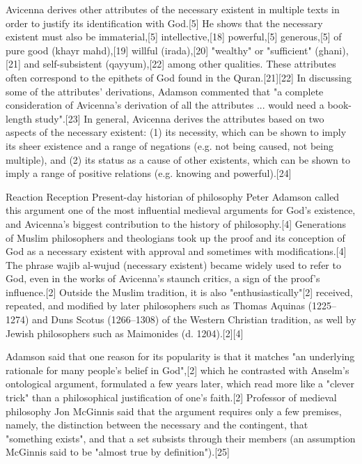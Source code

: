 Avicenna derives other attributes of the necessary existent in multiple texts in order to justify its identification with God.[5] He shows that the necessary existent must also be immaterial,[5] intellective,[18] powerful,[5] generous,[5] of pure good (khayr mahd),[19] willful (irada),[20] "wealthy" or "sufficient" (ghani),[21] and self-subsistent (qayyum),[22] among other qualities. These attributes often correspond to the epithets of God found in the Quran.[21][22] In discussing some of the attributes' derivations, Adamson commented that "a complete consideration of Avicenna's derivation of all the attributes ... would need a book-length study".[23] In general, Avicenna derives the attributes based on two aspects of the necessary existent: (1) its necessity, which can be shown to imply its sheer existence and a range of negations (e.g. not being caused, not being multiple), and (2) its status as a cause of other existents, which can be shown to imply a range of positive relations (e.g. knowing and powerful).[24]

Reaction
Reception
Present-day historian of philosophy Peter Adamson called this argument one of the most influential medieval arguments for God's existence, and Avicenna's biggest contribution to the history of philosophy.[4] Generations of Muslim philosophers and theologians took up the proof and its conception of God as a necessary existent with approval and sometimes with modifications.[4] The phrase wajib al-wujud (necessary existent) became widely used to refer to God, even in the works of Avicenna's staunch critics, a sign of the proof's influence.[2] Outside the Muslim tradition, it is also "enthusiastically"[2] received, repeated, and modified by later philosophers such as Thomas Aquinas (1225–1274) and Duns Scotus (1266–1308) of the Western Christian tradition, as well by Jewish philosophers such as Maimonides (d. 1204).[2][4]

Adamson said that one reason for its popularity is that it matches "an underlying rationale for many people's belief in God",[2] which he contrasted with Anselm's ontological argument, formulated a few years later, which read more like a "clever trick" than a philosophical justification of one's faith.[2] Professor of medieval philosophy Jon McGinnis said that the argument requires only a few premises, namely, the distinction between the necessary and the contingent, that "something exists", and that a set subsists through their members (an assumption McGinnis said to be "almost true by definition").[25]

